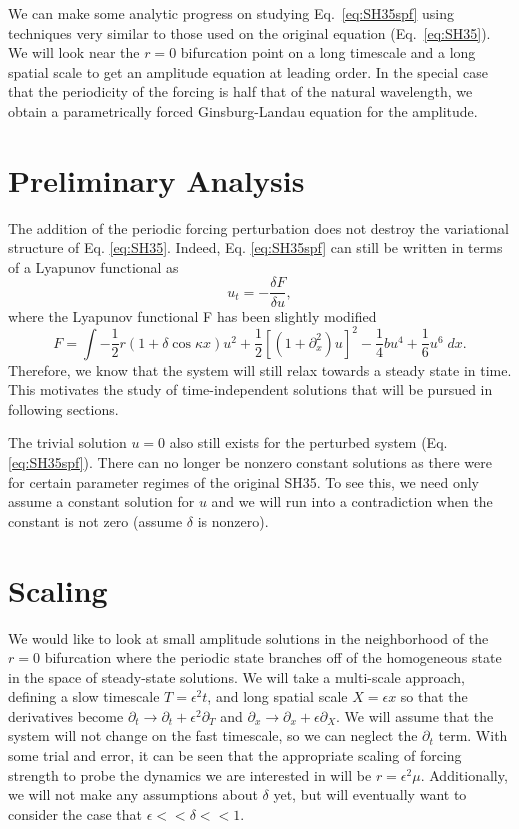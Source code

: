 \documentclass[api,pof,pre,12pt,a4paper]{revtex4-1}
\newcommand{\beqn}{\begin{equation}}
\newcommand{\eeqn}{\end{equation}}
\begin{document}
We can make some analytic progress on studying Eq.~\ref{eq:SH35spf} using techniques very similar to those used on the original equation (Eq.~\ref{eq:SH35}). We will look near the $r=0$ bifurcation point on a long timescale and a long spatial scale to get an amplitude equation at leading order.  In the special case that the periodicity of the forcing is half that of the natural wavelength, we obtain a parametrically forced Ginsburg-Landau equation for the amplitude.  


\section{Preliminary Analysis}
The addition of the periodic forcing perturbation does not destroy the variational structure of Eq. \ref{eq:SH35}.  Indeed, Eq. \ref{eq:SH35spf} can still be written in terms of a Lyapunov functional as 
\beqn
u_t=-\frac{\delta F}{\delta u},
\eeqn
where the Lyapunov functional F has been slightly modified
\beqn
F=\int -\frac{1}{2}r(1+\delta \cos\kappa x) u^2+\frac{1}{2}\left[(1+\partial_x^2) u\right]^2 -\frac{1}{4}bu^4+\frac{1}{6}u^6\; dx.
\eeqn
Therefore, we know that the system will still relax towards a steady state in time.  This motivates the study of time-independent solutions that will be pursued in following sections.

The trivial solution $u=0$ also still exists for the perturbed system (Eq. \ref{eq:SH35spf}). There can no longer be nonzero constant solutions as there were for certain parameter regimes of the original SH35.  To see this, we need only assume a constant solution for $u$ and we will run into  a contradiction when the constant is not zero (assume $\delta$ is nonzero).  


\section{Scaling}
We would like to look at small amplitude solutions in the neighborhood of the $r=0$ bifurcation where the periodic state branches off of the homogeneous state in the space of steady-state solutions.  We will take a multi-scale approach, defining a slow timescale $T=\epsilon^2t$, and long spatial scale $X=\epsilon x$ so that the derivatives become $\partial_t \rightarrow \partial_t+\epsilon^2\partial_T$ and $\partial_x \rightarrow \partial_x+\epsilon\partial_X$.  We will assume that the system will not change on the fast timescale, so we can neglect the $\partial_t$ term. With some trial and error, it can be seen that the appropriate scaling of forcing strength to probe the dynamics we are interested in will be $r=\epsilon^2 \mu$.     Additionally, we will not make any assumptions about $\delta$ yet, but will eventually want to consider the case that $\epsilon <<\delta <<1$.
\end{document}
